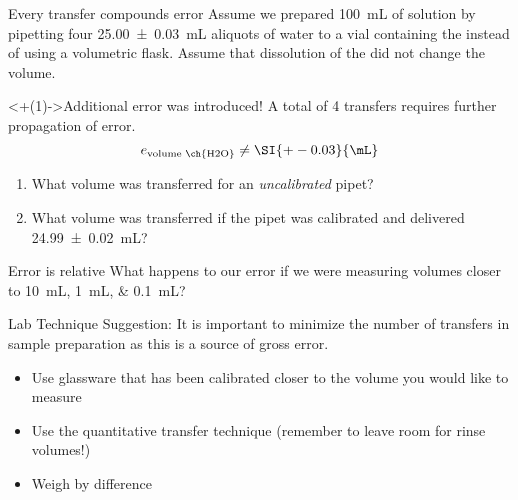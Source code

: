 \documentclass[handout]{beamer}
\begin{document}
\begin{frame}[t]{Every transfer compounds error}
	Assume we prepared \SI{100}{\milli\liter} of solution by pipetting four
	\SI{25.00 +- 0.03}{\milli\liter} aliquots of water to a vial containing
	the  instead of using a volumetric flask. Assume
	that dissolution of the  did not change the volume.

	\begin{alertblock}<+(1)->{Additional error was introduced!}
		A total of 4 transfers requires further propagation of error.
		\begin{equation*}
			e_\text{volume~\ch{H2O}} \neq \SI{+-0.03}{\mL}
		\end{equation*}
	\end{alertblock}

	\begin{enumerate}[<+(1)->]
		\item What volume was transferred for an \emph{uncalibrated}
			pipet?
		\item What volume was transferred if the pipet was calibrated
			and delivered \SI{24.99(2)}{\mL}?
	\end{enumerate}
\end{frame}

\begin{frame}{Error is relative}
	What happens to our error if we were measuring volumes closer to
	\SIlist[list-final-separator={, or }]{10;1;0.1}{\mL}?

	\bigskip

	\pause

	\begin{block}{Lab Technique Suggestion:}
		It is important to minimize the number of transfers in sample
		preparation as this is a source of \alert{gross error}.
		\begin{itemize}
			\item Use glassware that has been calibrated closer to
				the volume you would like to measure
			\item Use the quantitative transfer technique (remember
				to leave room for rinse volumes!)
			\item Weigh by difference
		\end{itemize}
	\end{block}
\end{frame}
\end{document}
